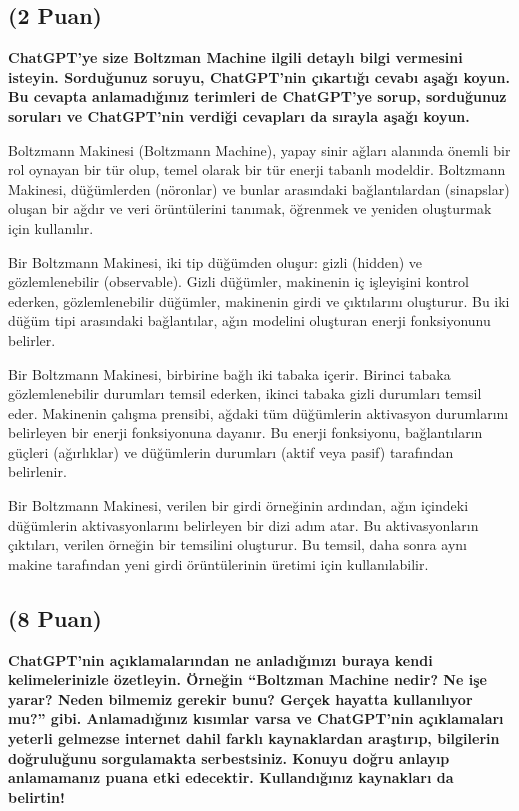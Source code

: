 \documentclass[11pt]{article}
\begin{document}
\subsection{(2 Puan)} \textbf{ChatGPT’ye size Boltzman Machine ilgili detaylı bilgi vermesini isteyin. Sorduğunuz soruyu, ChatGPT'nin çıkartığı cevabı aşağı koyun. Bu cevapta anlamadığınız terimleri de ChatGPT’ye sorup, sorduğunuz soruları ve ChatGPT’nin verdiği cevapları da sırayla aşağı koyun.}

    Boltzmann Makinesi (Boltzmann Machine), yapay sinir ağları alanında önemli bir rol oynayan bir tür olup, temel olarak bir tür enerji tabanlı modeldir. Boltzmann Makinesi, düğümlerden (nöronlar) ve bunlar arasındaki bağlantılardan (sinapslar) oluşan bir ağdır ve veri örüntülerini tanımak, öğrenmek ve yeniden oluşturmak için kullanılır.

    Bir Boltzmann Makinesi, iki tip düğümden oluşur: gizli (hidden) ve gözlemlenebilir (observable). Gizli düğümler, makinenin iç işleyişini kontrol ederken, gözlemlenebilir düğümler, makinenin girdi ve çıktılarını oluşturur. Bu iki düğüm tipi arasındaki bağlantılar, ağın modelini oluşturan enerji fonksiyonunu belirler.

    Bir Boltzmann Makinesi, birbirine bağlı iki tabaka içerir. Birinci tabaka gözlemlenebilir durumları temsil ederken, ikinci tabaka gizli durumları temsil eder. Makinenin çalışma prensibi, ağdaki tüm düğümlerin aktivasyon durumlarını belirleyen bir enerji fonksiyonuna dayanır. Bu enerji fonksiyonu, bağlantıların güçleri (ağırlıklar) ve düğümlerin durumları (aktif veya pasif) tarafından belirlenir.

    Bir Boltzmann Makinesi, verilen bir girdi örneğinin ardından, ağın içindeki düğümlerin aktivasyonlarını belirleyen bir dizi adım atar. Bu aktivasyonların çıktıları, verilen örneğin bir temsilini oluşturur. Bu temsil, daha sonra aynı makine tarafından yeni girdi örüntülerinin üretimi için kullanılabilir.

\subsection{(8 Puan)} \textbf{ChatGPT’nin açıklamalarından ne anladığınızı buraya kendi kelimelerinizle özetleyin. Örneğin ``Boltzman Machine nedir? Ne işe yarar? Neden bilmemiz gerekir bunu? Gerçek hayatta kullanılıyor mu?'' gibi. Anlamadığınız kısımlar varsa ve ChatGPT’nin açıklamaları yeterli gelmezse internet dahil farklı kaynaklardan araştırıp, bilgilerin doğruluğunu sorgulamakta serbestsiniz. Konuyu doğru anlayıp anlamamanız puana etki edecektir. Kullandığınız kaynakları da belirtin!}
\end{document}
